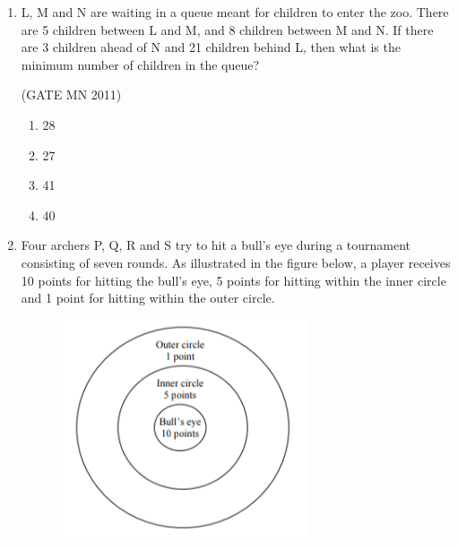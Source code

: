 \documentclass[journal]{IEEEtran}
\begin{document}
\begin{enumerate}
	\hfill(GATE MN 2011)

\begin{multicols}{4}
\begin{enumerate}
\item (3,4)
\item (3,-4)
\item (6,1)
\item (4,2)
\end{enumerate}
\end{multicols}

\item L, M and N are waiting in a queue meant for children to enter the zoo. There are 5 children between L and M, and 8 children between M and N. If there are 3 children ahead of N and 21 children behind L, then what is the minimum number of children in the queue?  


	\hfill(GATE MN 2011)
\begin{multicols}{4}
\begin{enumerate}
\item 28
\item 27
\item 41
\item 40
\end{enumerate}
\end{multicols}

\item Four archers P, Q, R and S try to hit a bull’s eye during a tournament consisting of seven rounds. As illustrated in the figure below, a player receives 10 points for hitting the bull’s eye, 5 points for hitting within the inner circle and 1 point for hitting within the outer circle.  
	\begin{figure}[H]
    \centering
        \includegraphics[width=0.7\textwidth]{Screenshot_2025_0816_123811.png}
	    \caption{}
    \label{fig:Q64}
    \end{figure}


\end{enumerate}
\end{document}

